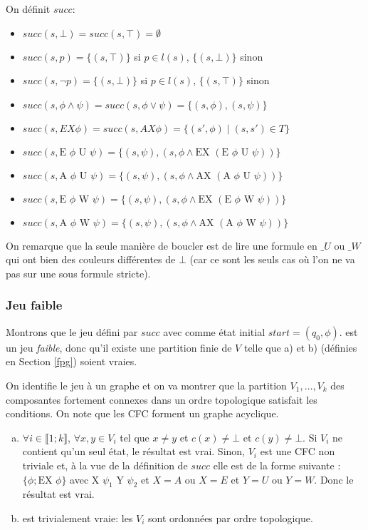 \documentclass[10pt,a4paper]{article}
\begin{document}
On définit $succ$:
\begin{itemize}
\item$ succ(s, \bot) = succ(s, \top) = \emptyset$
\item $succ(s, p) = \{(s,\top)\}$ si $p \in l(s)$, $\{(s,\bot)\}$ sinon
\item $succ(s, \neg p) = \{(s,\bot)\}$ si $p \in l(s)$, $\{(s,\top)\}$ sinon
\item $succ(s,\phi \land \psi) = succ(s, \phi \lor \psi) = \{(s,\phi), (s,\psi) \}$
\item $succ(s,EX \phi) = succ(s, AX \phi) = \{ (s', \phi) \mid (s,s') \in T \} $
\item $succ(s, \mbox{E } \phi \mbox{ U } \psi) = \{ (s,\psi), (s, \phi \land \mbox{EX }  (\mbox{E } \phi \mbox{ U } \psi)) \}$
\item $succ(s, \mbox{A } \phi \mbox{ U } \psi) = \{ (s,\psi), (s, \phi \land \mbox{AX }  (\mbox{A } \phi \mbox{ U } \psi)) \}$
\item $succ(s, \mbox{E } \phi \mbox{ W } \psi) = \{ (s,\psi), (s, \phi \land \mbox{EX }  (\mbox{E } \phi \mbox{ W } \psi)) \}$
\item $succ(s, \mbox{A } \phi \mbox{ W } \psi) = \{ (s,\psi), (s, \phi \land \mbox{AX } (\mbox{A } \phi \mbox{ W } \psi)) \}$
\end{itemize}

\bigskip
On remarque que la seule manière de boucler est de lire une formule en $\_U$ ou $\_W$ qui ont bien des couleurs différentes de $\bot$ (car ce sont les seuls cas où l'on ne va pas sur une sous formule stricte).

\subsubsection{Jeu faible}
Montrons que le jeu défini par $succ$ avec comme état initial $start = (q_0, \phi)$.
 est un jeu \emph{faible}, donc qu'il existe une partition finie de $V$ telle que a) et b) (définies en Section \ref{fpg}) soient vraies.

On identifie le jeu à un graphe et on va montrer que la partition $V_1, \dots, V_k$ des composantes fortement connexes dans un ordre topologique satisfait les conditions. On note que les CFC forment un graphe acyclique.

\begin{enumerate}[a)]
\item $\forall i \in \llbracket 1 ; k \rrbracket$, $\forall x,y \in V_i$ tel que $x \neq y$ et $c(x) \neq \bot$ et $c(y) \neq \bot$. Si $V_i$ ne contient qu'un seul état, le résultat est vrai. Sinon, $V_i$ est une CFC non triviale et, à la vue de la définition de $succ$ elle est de la forme suivante : $\{ \phi; \mbox{EX }\phi \}$ avec $\mbox{X } \psi_1 \mbox{ Y } \psi_2$ et $ X=A$ ou $X =E$ et $Y = U$ ou $Y=W$. Donc le résultat est vrai.

\item est trivialement vraie: les $V_i$ sont ordonnées par ordre topologique.
\end{enumerate}
\end{document}
